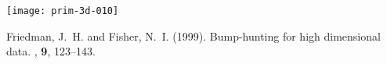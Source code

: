 \documentclass[a4paper,11pt]{article}
\begin{document}
\begin{center}
\texttt{[image: prim-3d-010]}
\end{center}





\begin{thebibliography}{}


Friedman, J.~H. and Fisher, N.~I. (1999).
\newblock Bump-hunting for high dimensional data.
, \textbf{9}, 123--143.


\end{thebibliography}

%
\end{document}
